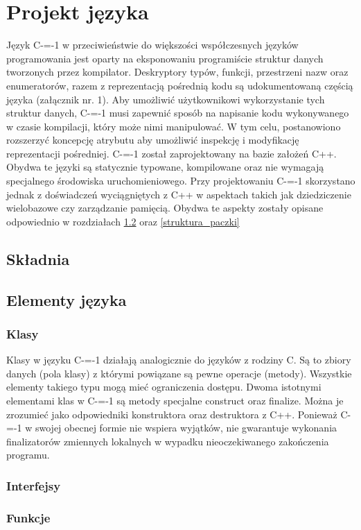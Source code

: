 \section{Projekt języka}
Język C-=-1 w przeciwieństwie do większości współczesnych języków programowania jest oparty na eksponowaniu programiście struktur danych tworzonych przez kompilator. Deskryptory typów, funkcji, przestrzeni nazw oraz enumeratorów, razem z reprezentacją pośrednią kodu są udokumentowaną częścią języka (załącznik nr. 1).
Aby umożliwić użytkownikowi wykorzystanie tych struktur danych, C-=-1 musi zapewnić sposób na napisanie kodu wykonywanego w czasie kompilacji, który może nimi manipulować. W tym celu, postanowiono rozszerzyć koncepcję atrybutu aby umożliwić inspekcję i modyfikację reprezentacji pośredniej.
C-=-1 został zaprojektowany na bazie założeń C++. Obydwa te języki są statycznie typowane, kompilowane oraz nie wymagają specjalnego środowiska uruchomieniowego. Przy projektowaniu C-=-1 skorzystano jednak z doświadczeń wyciągniętych z C++ w aspektach takich jak dziedziczenie wielobazowe czy zarządzanie pamięcią. Obydwa te aspekty zostały opisane odpowiednio w rozdziałach \ref{elementy_jezyka} oraz \ref{struktura_paczki}
\subsection{Składnia}
\subsection{Elementy języka}\label{elementy_jezyka}
\subsubsection{Klasy}\label{klasy}
Klasy w języku C-=-1 działają analogicznie do języków z rodziny C. Są to zbiory danych (pola klasy) z którymi powiązane są pewne operacje (metody). Wszystkie elementy takiego typu mogą mieć ograniczenia dostępu.
Dwoma istotnymi elementami klas w C-=-1 są metody specjalne construct oraz finalize. Można je zrozumieć jako odpowiedniki konstruktora oraz destruktora z C++. Ponieważ C-=-1 w swojej obecnej formie nie wspiera wyjątków, nie gwarantuje wykonania finalizatorów zmiennych lokalnych w wypadku nieoczekiwanego zakończenia programu.
\subsubsection{Interfejsy}
\subsubsection{Funkcje}
